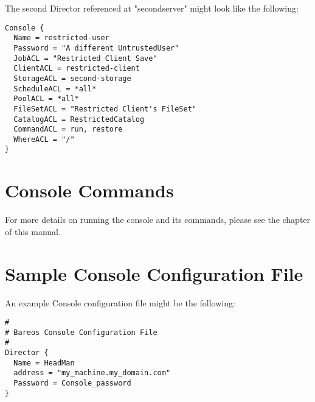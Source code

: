 The second Director referenced at "secondserver" might look
like the following:

\footnotesize
\begin{verbatim}
Console {
  Name = restricted-user
  Password = "A different UntrustedUser"
  JobACL = "Restricted Client Save"
  ClientACL = restricted-client
  StorageACL = second-storage
  ScheduleACL = *all*
  PoolACL = *all*
  FileSetACL = "Restricted Client's FileSet"
  CatalogACL = RestrictedCatalog
  CommandACL = run, restore
  WhereACL = "/"
}
\end{verbatim}
\normalsize



\section{Console Commands}

For more details on running the console and its commands, please see the
 chapter of this manual.

\section{Sample Console Configuration File}
\label{SampleConfiguration2}

An example Console configuration file might be the following:

\footnotesize
\begin{verbatim}
#
# Bareos Console Configuration File
#
Director {
  Name = HeadMan
  address = "my_machine.my_domain.com"
  Password = Console_password
}
\end{verbatim}
\normalsize
